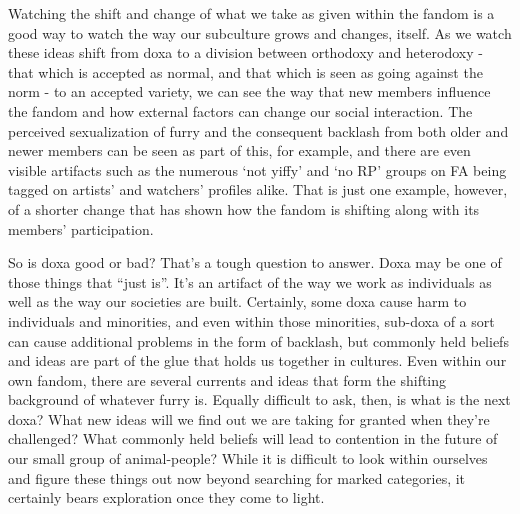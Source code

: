 Watching the shift and change of what we take as given within the fandom is a good way to watch the way our subculture grows and changes, itself. As we watch these ideas shift from doxa to a division between orthodoxy and heterodoxy - that which is accepted as normal, and that which is seen as going against the norm - to an accepted variety, we can see the way that new members influence the fandom and how external factors can change our social interaction. The perceived sexualization of furry and the consequent backlash from both older and newer members can be seen as part of this, for example, and there are even visible artifacts such as the numerous `not yiffy' and `no RP' groups on FA being tagged on artists' and watchers' profiles alike. That is just one example, however, of a shorter change that has shown how the fandom is shifting along with its members' participation.

So is doxa good or bad? That's a tough question to answer. Doxa may be one of those things that ``just is''. It's an artifact of the way we work as individuals as well as the way our societies are built. Certainly, some doxa cause harm to individuals and minorities, and even within those minorities, sub-doxa of a sort can cause additional problems in the form of backlash, but commonly held beliefs and ideas are part of the glue that holds us together in cultures. Even within our own fandom, there are several currents and ideas that form the shifting background of whatever furry is. Equally difficult to ask, then, is what is the next doxa? What new ideas will we find out we are taking for granted when they're challenged? What commonly held beliefs will lead to contention in the future of our small group of animal-people? While it is difficult to look within ourselves and figure these things out now beyond searching for marked categories, it certainly bears exploration once they come to light.

